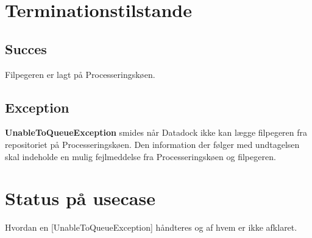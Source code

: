 \documentclass{article}
\begin{document}
\section{Terminationstilstande}

\subsection{Succes}
Filpegeren er lagt på Processeringskøen.

\subsection{Exception}
\textbf{UnableToQueueException} smides når Datadock ikke kan lægge
filpegeren fra repositoriet på Processeringskøen. Den information der
følger med undtagelsen skal indeholde en mulig fejlmeddelse fra
Processeringskøen og filpegeren. 


\section{Status på usecase}
Hvordan en [UnableToQueueException] håndteres og af hvem er ikke afklaret.
\end{document}
